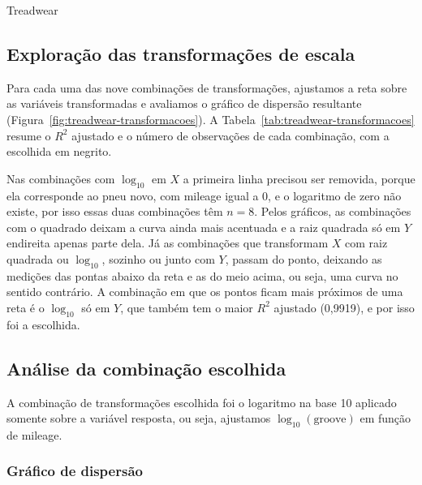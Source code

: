 \begin{dataset}{Treadwear}
\subsection{Exploração das transformações de escala}

Para cada uma das nove combinações de transformações, ajustamos a reta sobre as variáveis transformadas e avaliamos o gráfico de dispersão resultante (Figura~\ref{fig:treadwear-transformacoes}). A Tabela~\ref{tab:treadwear-transformacoes} resume o $R^2$ ajustado e o número de observações de cada combinação, com a escolhida em negrito.



Nas combinações com $\log_{10}$ em $X$ a primeira linha precisou ser removida, porque ela corresponde ao pneu novo, com mileage igual a 0, e o logaritmo de zero não existe, por isso essas duas combinações têm $n = 8$. Pelos gráficos, as combinações com o quadrado deixam a curva ainda mais acentuada e a raiz quadrada só em $Y$ endireita apenas parte dela. Já as combinações que transformam $X$ com raiz quadrada ou $\log_{10}$, sozinho ou junto com $Y$, passam do ponto, deixando as medições das pontas abaixo da reta e as do meio acima, ou seja, uma curva no sentido contrário. A combinação em que os pontos ficam mais próximos de uma reta é o $\log_{10}$ só em $Y$, que também tem o maior $R^2$ ajustado (0,9919), e por isso foi a escolhida.

\subsection{Análise da combinação escolhida}

A combinação de transformações escolhida foi o logaritmo na base 10 aplicado somente sobre a variável resposta, ou seja, ajustamos $\log_{10}(\text{groove})$ em função de mileage.

\subsubsection{Gráfico de dispersão}



\end{dataset}
